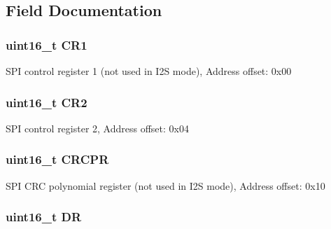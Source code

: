 \subsection{Field Documentation}
\hypertarget{struct_s_p_i___type_def_a61400ce239355b62aa25c95fcc18a5e1}{
\subsubsection[{C\-R1}]{ uint16\-\_\-t C\-R1}}\label{struct_s_p_i___type_def_a61400ce239355b62aa25c95fcc18a5e1}
S\-P\-I control register 1 (not used in I2\-S mode), Address offset\-: 0x00 \hypertarget{struct_s_p_i___type_def_a2a3e81bd118d1bc52d24a0b0772e6a0c}{
\subsubsection[{C\-R2}]{ uint16\-\_\-t C\-R2}}\label{struct_s_p_i___type_def_a2a3e81bd118d1bc52d24a0b0772e6a0c}
S\-P\-I control register 2, Address offset\-: 0x04 \hypertarget{struct_s_p_i___type_def_a942ae09a7662bad70ef336f2bed43a19}{
\subsubsection[{C\-R\-C\-P\-R}]{ uint16\-\_\-t C\-R\-C\-P\-R}}\label{struct_s_p_i___type_def_a942ae09a7662bad70ef336f2bed43a19}
S\-P\-I C\-R\-C polynomial register (not used in I2\-S mode), Address offset\-: 0x10 \hypertarget{struct_s_p_i___type_def_a0a1acc0425516ff7969709d118b96a3b}{
\subsubsection[{D\-R}]{ uint16\-\_\-t D\-R}}\label{struct_s_p_i___type_def_a0a1acc0425516ff7969709d118b96a3b}
